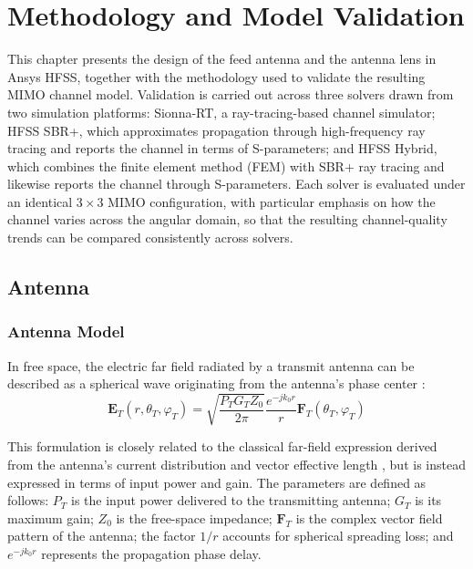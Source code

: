 \chapter{Methodology and Model Validation}


This chapter presents the design of the feed antenna and the antenna lens in Ansys HFSS, together with the methodology used to validate the resulting MIMO channel model. Validation is carried out across three solvers drawn from two simulation platforms: Sionna-RT, a ray-tracing-based channel simulator; HFSS SBR+, which approximates propagation through high-frequency ray tracing and reports the channel in terms of S-parameters; and HFSS Hybrid, which combines the finite element method (FEM) with SBR+ ray tracing and likewise reports the channel through S-parameters. Each solver is evaluated under an identical $3\times3$ MIMO configuration, with particular emphasis on how the channel varies across the angular domain, so that the resulting channel-quality trends can be compared consistently across solvers.

\section{Antenna}
\subsection{Antenna Model}
In free space, the electric far field radiated by a transmit antenna can be described as a spherical wave originating from the antenna's phase center \cite{NVIDIACorporation2026}:
\begin{equation}
\mathbf{E}_T(r, \theta_T, \varphi_T) = \sqrt{\frac{P_T G_T Z_0}{2\pi}} \frac{e^{-jk_0 r} }{r}\mathbf{F}_T(\theta_T, \varphi_T)
\end{equation}

This formulation is closely related to the classical far-field expression derived from the antenna's current distribution and vector effective length \cite{ConstantineABalanis2016}, but is instead expressed in terms of input power and gain. The parameters are defined as follows: $P_T$ is the input power delivered to the transmitting antenna; $G_T$ is its maximum gain; $Z_0$ is the free-space impedance; $\mathbf{F}_T$ is the complex vector field pattern of the antenna; the factor $1/r$ accounts for spherical spreading loss; and $e^{-jk_0 r}$ represents the propagation phase delay.

